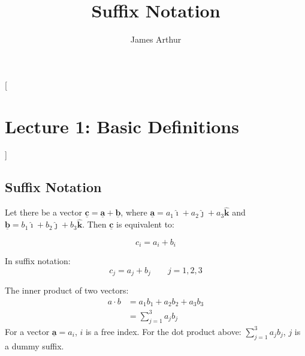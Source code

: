 \documentclass{article}
\title{Suffix Notation}
\author{James Arthur}
\renewcommand{\vec}[1]{\underline{\textbf{#1}}}
\newcommand{\veci}{\bm{\hat{\imath}}}
\newcommand{\vecj}{\bm{\hat{\jmath}}}
\newcommand{\veck}{\bm{\hat{k}}}
\begin{document}
\maketitle
\tableofcontents\newpage


[\section{Lecture 1: Basic Definitions}]

\subsection{Suffix Notation}

Let there be a vector $\vec{c} = \vec{a} + \vec{b}$, where $\vec{a} = a_1 \veci + a_2 \vecj + a_3 \veck$ and $\vec{b} = {b}_1 \veci + {b}_2 \vecj + {b}_3 \veck$. Then $\vec{c} $ is equivalent to:

$$ c_i = a_i + b_i $$

In suffix notation:
$$ c_j = a_j + b_j \qquad j = 1, 2, 3 $$

The inner product of two vectors:
\begin{align*}
   a\cdot b &= a_1b_1 + a_2b_2 + a_3b_3\\
   &= \sum_{j=1}^3{a_jb_j}
\end{align*}
For a vector $\vec{a} = a_i$, $i$ is a free index. For the dot product above: $\displaystyle{\sum_{j=1}^3{a_jb_j}} $, $j $ is a dummy suffix.
\end{document}
